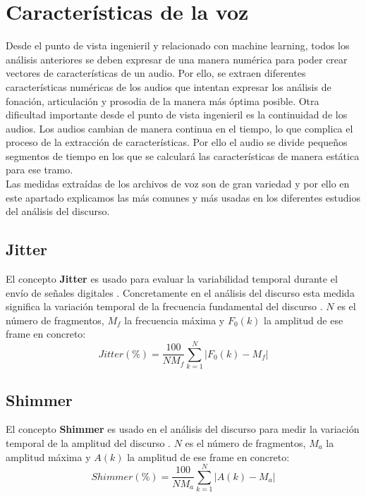 \section{Características de la voz} \label{sec:ccas}
Desde el punto de vista ingenieril y relacionado con machine learning, todos los análisis anteriores se deben expresar de una manera numérica para poder crear vectores de características de un audio. Por ello, se extraen diferentes características numéricas de los audios que intentan expresar los análisis de fonación, articulación y prosodia de la manera más óptima posible. Otra dificultad importante desde el punto de vista ingenieril es la continuidad de los audios. Los audios cambian de manera continua en el tiempo, lo que complica el proceso de la extracción de características. Por ello el audio se divide pequeños segmentos de tiempo en los que se calculará las características de manera estática para ese tramo.\\
Las medidas extraídas de los archivos de voz son de gran variedad y por ello en este apartado explicamos las más comunes y más usadas en los diferentes estudios del análisis del discurso. 

\subsection{Jitter}
El concepto \textbf{Jitter} es usado para evaluar la variabilidad temporal durante el envío de señales digitales \cite{wiki:jitter}. Concretamente en el análisis del discurso esta medida significa la variación temporal de la frecuencia fundamental del discurso \cite{neurospeech}. $N$ es el número de fragmentos, $M_{f}$ la frecuencia máxima y $F_{0}(k)$ la amplitud de ese frame en concreto:
\begin{equation}
Jitter(\%) = \frac{100}{N M_{f}} \sum_{k=1}^{N}|F_{0}(k)-M_{f}|
\end{equation}

\subsection{Shimmer}
El concepto \textbf{Shimmer} es usado en el análisis del discurso para medir la variación temporal de la amplitud del discurso \cite{neurospeech}. $N$ es el número de fragmentos, $M_{a}$ la amplitud máxima y $A(k)$ la amplitud de ese frame en concreto:
\begin{equation}
Shimmer(\%) = \frac{100}{N M_{a}} \sum_{k=1}^{N}|A(k)-M_{a}|
\end{equation}

